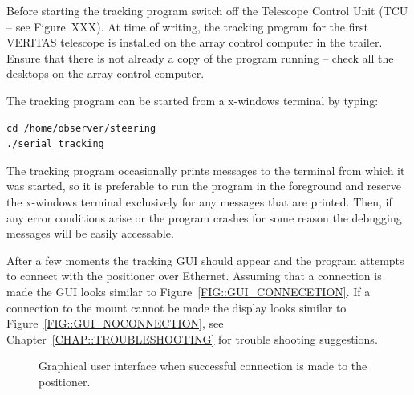 \documentclass[letterpaper,12pt]{report}
\begin{document}
Before starting the tracking program switch off the Telescope Control
Unit (TCU -- see Figure~XXX). At time of writing, the tracking program
for the first VERITAS telescope is installed on the array control
computer in the trailer. Ensure that there is not already a copy of
the program running -- check all the desktops on the
array control computer.

The tracking program can be started from a x-windows terminal by
typing:
\begin{verbatim}
cd /home/observer/steering
./serial_tracking
\end{verbatim}
The tracking program occasionally prints messages to the terminal from
which it was started, so it is preferable to run the program in the
foreground and reserve the x-windows terminal exclusively for any
messages that are printed. Then, if any error conditions arise or the
program crashes for some reason the debugging messages will be easily
accessable.

After a few moments the tracking GUI should appear and the program
attempts to connect with the positioner over Ethernet. Assuming that a
connection is made the GUI looks similar to
Figure~\ref{FIG::GUI_CONNECETION}. If a connection to the
mount cannot be made the display looks similar to
Figure~\ref{FIG::GUI_NOCONNECTION}, see
Chapter~\ref{CHAP::TROUBLESHOOTING} for trouble shooting suggestions.

\begin{figure}[p]
\centerline{}
\caption{\label{FIG::GUI_CONNECTION} Graphical user 
interface when successful connection is made to the positioner.}
\end{figure}
\end{document}
